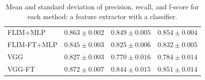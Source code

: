 \documentclass[journal, twoside]{IEEEtran}
\begin{document}
{\begin{table}[!t]
\begin{center}
\begin{tabular}{|l|c|c|c|}
    FLIM+MLP & $0.863 \pm 0.002$ & $0.849 \pm 0.005$ & $0.854 \pm 0.004$\\
    FLIM-FT+MLP & $0.845 \pm 0.003$ & $0.825\pm 0.006$ & $0.832 \pm 0.005$ \\

    VGG & $0.827 \pm 0.003$ & $0.770 \pm 0.016$  & $ 0.784 \pm 0.014$\\
    VGG-FT & $0.872 \pm 0.007$ & $0.844 \pm 0.015$ & $0.851 \pm 0.014 $ \\
   
  \hline
  \end{tabular}
  \end{center}

\caption{Mean and standard deviation of precision, recall, and f-score for each method: a feature extractor with a classifier.}
  \label{tab:results}
\end{table}



}
\end{document}
